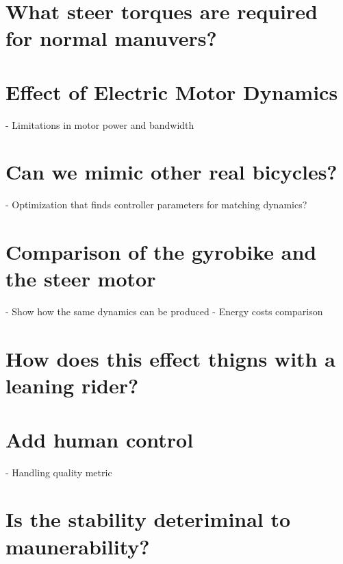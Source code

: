 \documentclass[12pt]{article}
\begin{document}
\section{What steer torques are required for normal manuvers?}

\section{Effect of Electric Motor Dynamics}

- Limitations in motor power and bandwidth

\section{Can we mimic other real bicycles?}

- Optimization that finds controller parameters for matching dynamics?

\section{Comparison of the gyrobike and the steer motor}

- Show how the same dynamics can be produced
- Energy costs comparison

\section{How does this effect thigns with a leaning rider?}

\section{Add human control}

- Handling quality metric

\section{Is the stability deteriminal to maunerability?}
\end{document}
